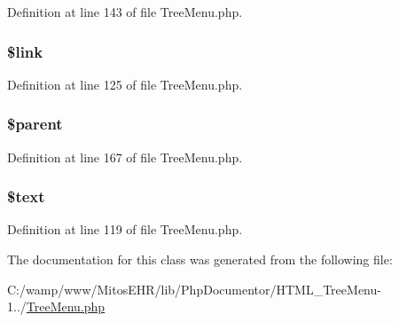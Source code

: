 \-Definition at line 143 of file \-Tree\-Menu.\-php.

\hypertarget{class_h_t_m_l___tree_node_a5d346e31b75d916e3bac9cb193bfc97f}{
\subsubsection[{\$link}]{\setlength{\rightskip}{0pt plus 5cm}\$link}}\label{class_h_t_m_l___tree_node_a5d346e31b75d916e3bac9cb193bfc97f}


\-Definition at line 125 of file \-Tree\-Menu.\-php.

\hypertarget{class_h_t_m_l___tree_node_a4e2313a4b35b72a06ac45fd38960f677}{
\subsubsection[{\$parent}]{\setlength{\rightskip}{0pt plus 5cm}\$parent}}\label{class_h_t_m_l___tree_node_a4e2313a4b35b72a06ac45fd38960f677}


\-Definition at line 167 of file \-Tree\-Menu.\-php.

\hypertarget{class_h_t_m_l___tree_node_adf95f30eaafccead90ab5e2cdb55e9b9}{
\subsubsection[{\$text}]{\setlength{\rightskip}{0pt plus 5cm}\$text}}\label{class_h_t_m_l___tree_node_adf95f30eaafccead90ab5e2cdb55e9b9}


\-Definition at line 119 of file \-Tree\-Menu.\-php.



\-The documentation for this class was generated from the following file\-:\begin{DoxyCompactItemize}
\item 
\-C\-:/wamp/www/\-Mitos\-E\-H\-R/lib/\-Php\-Documentor/\-H\-T\-M\-L\-\_\-\-Tree\-Menu-\/1../\hyperlink{_tree_menu_8php}{\-Tree\-Menu.\-php}\end{DoxyCompactItemize}
